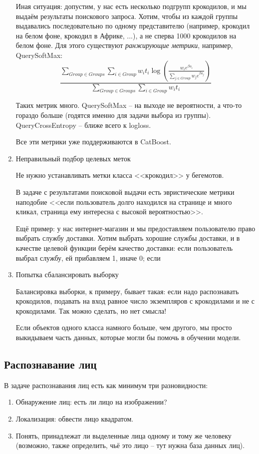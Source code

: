 \documentclass[main.tex]{subfiles}
\begin{document}
\begin{enumerate}[noitemsep]
	Иная ситуация: допустим, у нас есть несколько подгрупп крокодилов, и мы выдаём результаты поискового запроса.
	Хотим, чтобы из каждой группы выдавались последовательно по одному представителю (например, крокодил на белом фоне, крокодил в Африке, ...), а не сперва 1000 крокодилов на белом фоне.
	Для этого существуют \emph{ранжирующие метрики}, например, QuerySoftMax: 
	$$ \frac{\sum_{Group \in Groups} \sum_{i \in Group} w_i t_i \log\left( \frac{w_i e^{\beta \alpha_i}}{\sum_{j \in Group} w_j e^{\beta a_j} } \right)}{\sum_{Group \in Groups} \sum_{i \in Group} w_i t_i} $$
	
	Таких метрик много.
	QuerySoftMax -- на выходе не вероятности, а что-то гораздо больше (годятся именно для задачи выбора из группы).
	QueryCrossEntropy -- ближе всего к logloss.
	
	Все эти метрики уже поддерживаются в CatBoost.
	
	\item Неправильный подбор целевых меток
	
	Не нужно устанавливать метки класса <<крокодил>> у бегемотов.
	
	В задаче с результатами поисковой выдачи есть эвристические метрики наподобие <<если пользователь долго находился на странице и много кликал, страница ему интересна с высокой вероятностью>>.
	
	Ещё пример: у нас интернет-магазин и мы предоставляем пользователю право выбрать службу доставки.
	Хотим выбрать хорошие службы доставки, и в качестве целевой функции берём качество доставки: если пользователь выбрал службу, ей прибавляем 1, иначе 0; если 
	
	\item Попытка сбалансировать выборку
	
	Балансировка выборки, к примеру, бывает такая: если надо распознавать крокодилов, подавать на вход равное число экземпляров с крокодилами и не с крокодилами.
	Так можно сделать, но нет смысла!
	
	Если объектов одного класса намного больше, чем другого, мы просто выкидываем часть данных, которые могли бы помочь в обучении модели.
\end{enumerate}

\subsection{Распознавание лиц}
В задаче распознавания лиц есть как минимум три разновидности:

\begin{enumerate}[noitemsep]
	\item Обнаружение лиц: есть ли лицо на изображении?
	\item Локализация: обвести лицо квадратом.
	\item Понять, принадлежат ли выделенные лица одному и тому же человеку (возможно, также определить, чьё это лицо -- тут нужна база данных лиц).
\end{enumerate}
\end{document}
